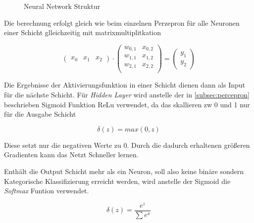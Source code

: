 \begin{figure}[htb]
    \centering
    
    \caption{Neural Network Struktur}
    \label{fig:nn}
\end{figure}



Die berechnung erfolgt gleich wie beim einzelnen Perzepron für alle Neuronen 
einer Schicht glleichzeitig mit matrixmultiplitkation

\begin{equation}
    \label{mat:feedforward}
    \begin{pmatrix}
        x_{0} & x_{1} & x_{2}
    \end{pmatrix}
    \cdot
    \begin{pmatrix}
        w_{0,1} & x_{0,2}\\
        w_{1,1} & x_{1,2}\\
        w_{2,1} & x_{2,2}\\
    \end{pmatrix}
    =
    \begin{pmatrix}
        y_{1}\\
        y_{2}
    \end{pmatrix}
\end{equation}


Die Ergebnisse der Aktivierungsfunktion in einer Schicht dienen 
dann als Input für die nächste Schicht. Für \textit{Hidden Layer}
wird anstelle der in \ref{subsec:percepron} beschrieben Sigmoid 
Funktion ReLu verwendet, da das skallieren zw 0 und 1 nur für die 
Ausgabe Schicht

\begin{equation}
    \label{eq:relu}
    \delta(z) = max(0,z)
\end{equation}

Diese setzt nur die negativen Werte zu 0. Durch die dadurch erhaltenen
größeren Gradienten kann das Netzt Schneller lernen.


Enthält die Output Schicht mehr als ein Neuron, soll also keine binäre sondern 
Kategorische Klassifizierung erreicht werden, wird anstelle der Sigmoid 
die \textit{Softmax} Funtion verwendet.


\begin{equation}
    \label{eq:softmax}
    \delta(z) = \frac{e^{z}}{\sum e^{x}}
\end{equation}

